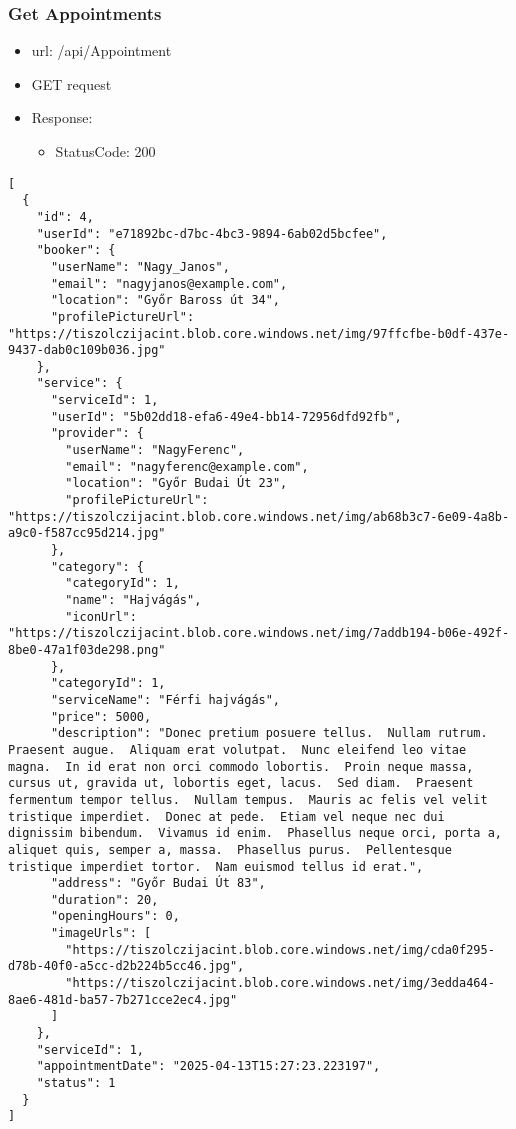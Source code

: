 \documentclass[11pt]{article}
\begin{document}
\subsubsection{Get Appointments}
\label{sec:orgcdbedee}
\begin{itemize}
\item url: /api/Appointment
\item GET request
\item Response:
\begin{itemize}
\item StatusCode: 200
\end{itemize}
\end{itemize}
\begin{verbatim}
[
  {
    "id": 4,
    "userId": "e71892bc-d7bc-4bc3-9894-6ab02d5bcfee",
    "booker": {
      "userName": "Nagy_Janos",
      "email": "nagyjanos@example.com",
      "location": "Győr Baross út 34",
      "profilePictureUrl": "https://tiszolczijacint.blob.core.windows.net/img/97ffcfbe-b0df-437e-9437-dab0c109b036.jpg"
    },
    "service": {
      "serviceId": 1,
      "userId": "5b02dd18-efa6-49e4-bb14-72956dfd92fb",
      "provider": {
        "userName": "NagyFerenc",
        "email": "nagyferenc@example.com",
        "location": "Győr Budai Út 23",
        "profilePictureUrl": "https://tiszolczijacint.blob.core.windows.net/img/ab68b3c7-6e09-4a8b-a9c0-f587cc95d214.jpg"
      },
      "category": {
        "categoryId": 1,
        "name": "Hajvágás",
        "iconUrl": "https://tiszolczijacint.blob.core.windows.net/img/7addb194-b06e-492f-8be0-47a1f03de298.png"
      },
      "categoryId": 1,
      "serviceName": "Férfi hajvágás",
      "price": 5000,
      "description": "Donec pretium posuere tellus.  Nullam rutrum.  Praesent augue.  Aliquam erat volutpat.  Nunc eleifend leo vitae magna.  In id erat non orci commodo lobortis.  Proin neque massa, cursus ut, gravida ut, lobortis eget, lacus.  Sed diam.  Praesent fermentum tempor tellus.  Nullam tempus.  Mauris ac felis vel velit tristique imperdiet.  Donec at pede.  Etiam vel neque nec dui dignissim bibendum.  Vivamus id enim.  Phasellus neque orci, porta a, aliquet quis, semper a, massa.  Phasellus purus.  Pellentesque tristique imperdiet tortor.  Nam euismod tellus id erat.",
      "address": "Győr Budai Út 83",
      "duration": 20,
      "openingHours": 0,
      "imageUrls": [
        "https://tiszolczijacint.blob.core.windows.net/img/cda0f295-d78b-40f0-a5cc-d2b224b5cc46.jpg",
        "https://tiszolczijacint.blob.core.windows.net/img/3edda464-8ae6-481d-ba57-7b271cce2ec4.jpg"
      ]
    },
    "serviceId": 1,
    "appointmentDate": "2025-04-13T15:27:23.223197",
    "status": 1
  }
]
\end{verbatim}
\end{document}
